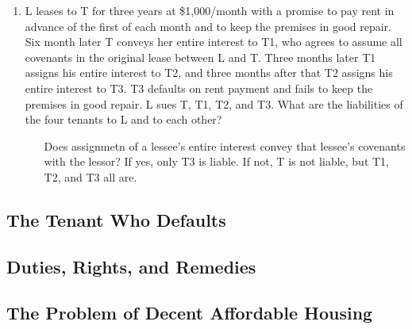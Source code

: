 \begin{enumerate}
\begin{enumerate}
        \item L leases to T for three years at \$1,000/month with a promise to 
        pay rent in advance of the first of each month and to keep the 
        premises in good repair. Six month later T conveys her entire interest 
        to T1, who agrees to assume all covenants in the original lease 
        between L and T. Three months later T1 assigns his entire interest to 
        T2, and three months after that T2 assigns his entire interest to T3. 
        T3 defaults on rent payment and fails to keep the premises in good 
        repair. L sues T, T1, T2, and T3. What are the liabilities of the four 
        tenants to L and to each other?
        \begin{enumerate}
            \item [Does assignmetn of a lessee's entire interest convey that 
            lessee's covenants with the lessor? If yes, only T3 is liable. If 
            not, T is not liable, but T1, T2, and T3 all are.]
        \end{enumerate}
    \end{enumerate}
\end{enumerate}

\subsection{The Tenant Who Defaults}


\subsection{Duties, Rights, and Remedies}


\subsection{The Problem of Decent Affordable Housing}

